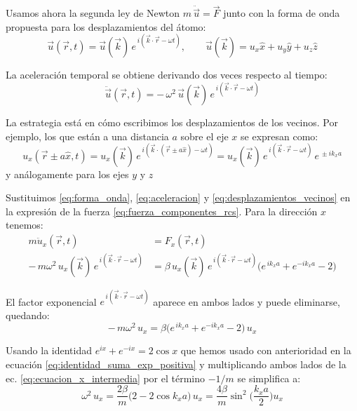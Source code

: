 \documentclass{article}
\begin{document}
\;

Usamos ahora la segunda ley de Newton \(m\,\ddot{\vec u} = \vec F\) junto con la forma de onda propuesta para los desplazamientos del átomo:
\begin{equation}
\boxed{
\vec u(\vec r,t)=\vec u(\vec k)\,e^{\,i(\vec k\cdot\vec r-\omega t)}, \qquad 
\vec u(\vec k)=u_x\hat x+u_y\hat y+u_z\hat z
}
\label{eq:forma_onda}
\end{equation}

La aceleración temporal se obtiene derivando dos veces respecto al tiempo:
\begin{equation}
\ddot{\vec u}(\vec r,t) = -\,\omega^2\,\vec u(\vec k)\,e^{\,i(\vec k\cdot\vec r-\omega t)}
\label{eq:aceleracion}
\end{equation}

La estrategia está en cómo escribimos los desplazamientos de los vecinos.  
Por ejemplo, los que están a una distancia \(a\) sobre el eje \(x\) se expresan como:
\begin{equation}
u_x(\vec r{\pm}a\hat x,t)
= u_x(\vec k)\,e^{\,i(\vec k\cdot(\vec r{\pm}a\hat x)-\omega t)}
= u_x(\vec k)\,e^{\,i(\vec k\cdot\vec r-\omega t)}\,e^{\,\pm i k_x a}
\label{eq:desplazamientos_vecinos}
\end{equation}
y análogamente para los ejes \(y\) y \(z\)

Sustituimos \eqref{eq:forma_onda}, \eqref{eq:aceleracion} y \eqref{eq:desplazamientos_vecinos} en la expresión de la fuerza \eqref{eq:fuerza_componentes_rcs}.  
Para la dirección \(x\) tenemos:
\begin{equation}
\begin{split}
m\ddot u_x(\vec r,t)
&=F_x(\vec r,t)\\
-\,m\omega^2\,u_x(\vec k)\,e^{\,i(\vec k\cdot\vec r-\omega t)}
&=\beta\,u_x(\vec k)\,e^{\,i(\vec k\cdot\vec r-\omega t)}\big(e^{\,i k_x a}+e^{-i k_x a}-2\big)
\end{split}
\label{eq:newton_x}
\end{equation}

El factor exponencial \(e^{\,i(\vec k\cdot\vec r-\omega t)}\) aparece en ambos lados y puede eliminarse, quedando:
\begin{equation}
-\,m\omega^2\,u_x=\beta\big(e^{\,i k_x a}+e^{-i k_x a}-2\big)\,u_x
\label{eq:ecuacion_x_intermedia}
\end{equation}

Usando la identidad \(e^{ix}+e^{-ix}=2\cos x\) que hemos usado con anterioridad en la ecuación \eqref{eq:identidad_suma_exp_positiva}  y multiplicando ambos lados de la ec. \eqref{eq:ecuacion_x_intermedia} por el término $-1/m$ se simplifica a:
\begin{equation}
\omega^2\,u_x=\frac{2\beta}{m}\big(2-2\cos k_x a\big)\,u_x
=\frac{4\beta}{m}\sin^2\!\Big(\frac{k_x a}{2}\Big)u_x
\label{eq:ecuacion_x_final}
\end{equation}
\end{document}
